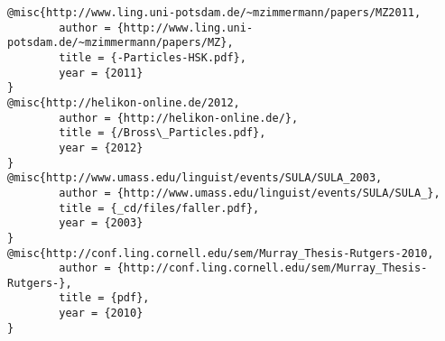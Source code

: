 \begin{verbatim}
@misc{http://www.ling.uni-potsdam.de/~mzimmermann/papers/MZ2011,
        author = {http://www.ling.uni-potsdam.de/~mzimmermann/papers/MZ},
        title = {-Particles-HSK.pdf},
        year = {2011}
}
@misc{http://helikon-online.de/2012,
        author = {http://helikon-online.de/},
        title = {/Bross\_Particles.pdf},
        year = {2012}
}
@misc{http://www.umass.edu/linguist/events/SULA/SULA_2003,
        author = {http://www.umass.edu/linguist/events/SULA/SULA_},
        title = {_cd/files/faller.pdf},
        year = {2003}
}
@misc{http://conf.ling.cornell.edu/sem/Murray_Thesis-Rutgers-2010,
        author = {http://conf.ling.cornell.edu/sem/Murray_Thesis-Rutgers-},
        title = {pdf},
        year = {2010}
}
\end{verbatim}